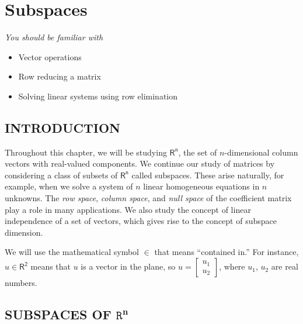 \documentclass[../main.tex]{subfiles}
\begin{document}
\chapter{Subspaces}
\label{chap:chap_3}

\emph{You should be familiar with}
	\begin{itemize}[noitemsep]
	\item Vector operations
	\item Row reducing a matrix
	\item Solving linear systems using row elimination
	\end{itemize}

\section[Introduction]{INTRODUCTION}
Throughout this chapter, we will be studying $\mathsf{R^{n}}$, the set of $n$-dimensional column vectors with real-valued components. We continue our study of matrices by considering a class of subsets of $\mathsf{R^{n}}$ called subspaces. These arise naturally, for example, when we solve a system of $n$ linear homogeneous equations in $n$ unknowns. The \emph{row space}, \emph{column space}, and \emph{null space} of the coefficient matrix play a role in many applications. We also study the concept of linear independence of a set of vectors,
which gives rise to the concept of subspace dimension.

\begin{remark}
	We will use the mathematical symbol $\in$ that means “contained in.” For instance, $u \in  \mathsf{R^2}$ means that $u$ is a vector in the plane, so $u = \begin{bmatrix}u_1\\ u_2 \end{bmatrix}$, where $u_1$, $u_2$ are real numbers.
\end{remark}

\section[Subspaces of \texttt{R}$^n$]{SUBSPACES OF $\texttt{R}^\mathbf{n}$}
\end{document}
